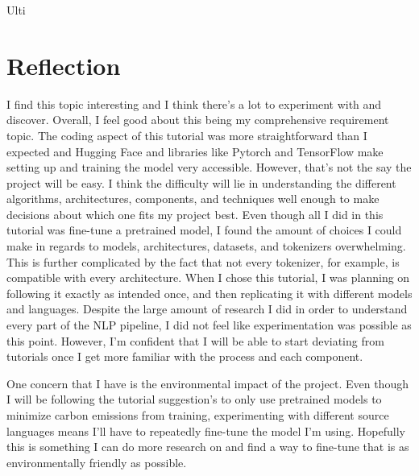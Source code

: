\documentclass[10pt,twocolumn]{article}
\begin{document}
Ulti


\section{Reflection}
I find this topic interesting and I think there’s a lot to experiment with and discover. Overall, I feel good about this being my comprehensive requirement topic. The coding aspect of this tutorial was more straightforward than I expected and Hugging Face and libraries like Pytorch and TensorFlow make setting up and training the model very accessible. 
However, that's not the say the project will be easy. I think the difficulty will lie in understanding the different algorithms, architectures, components, and techniques well enough to make decisions about which one fits my project best. Even though all I did in this tutorial was fine-tune a pretrained model, I found the amount of choices I could make in regards to models, architectures, datasets, and tokenizers overwhelming. This is further complicated by the fact that not every tokenizer, for example, is compatible with every architecture. When I chose this tutorial, I was planning on following it exactly as intended once, and then replicating it with different models and languages. Despite the large amount of research I did in order to understand every part of the NLP pipeline, I did not feel like experimentation was possible as this point. However, I'm confident that I will be able to start deviating from tutorials once I get more familiar with the process and each component. 

One concern that I have is the environmental impact of the project. Even though I will be following the tutorial suggestion's to only use pretrained models to minimize carbon emissions from training, experimenting with different source languages means I'll have to repeatedly fine-tune the model I'm using. Hopefully this is something I can do more research on and find a way to fine-tune that is as environmentally friendly as possible.
\end{document}
